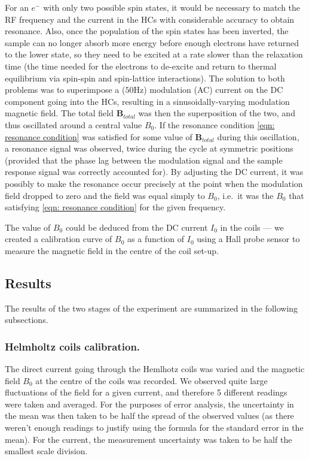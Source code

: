 \documentclass[a4paper]{jpconf}
\numberwithin{equation}{section}
\begin{document}
For an $e^-$ with only two possible spin states, it would be necessary to match the RF frequency and the current in the HCs with considerable accuracy to obtain resonance. Also, once the population of the spin states has been inverted, the sample can no longer absorb more energy before enough electrons have returned to the lower state, so they need to be excited at a rate slower than the relaxation time (the time needed for the electrons to de-excite and return to thermal equilibrium via spin-spin and spin-lattice interactions). The solution to both problems was to superimpose a ($50 \si{\hertz}$) modulation (AC) current on the DC component going into the HCs, resulting in a sinusoidally-varying modulation magnetic field. The total field $\mathbf{B}_{total}$ was then the superposition of the two, and thus oscillated around a central value $B_0$. If the resonance condition \eqref{eqn: resonance condition} was satisfied for some value of $\mathbf{B}_{total}$ during this oscillation, a resonance signal was observed, twice during the cycle at symmetric positions (provided that the phase lag between the modulation signal and the sample response signal was correctly accounted for). By adjusting the DC current, it was possibly to make the resonance occur precisely at the point when the modulation field dropped to zero and the field was equal simply to $B_0$, i.e.\ it was the $B_0$ that satisfying \eqref{eqn: resonance condition} for the given frequency.

The value of $B_0$ could be deduced from the DC current $I_0$ in the coils --- we created a calibration curve of $B_0$ as a function of $I_0$ using a Hall probe sensor to measure the magnetic field in the centre of the coil set-up.

\subsection{Results}
The results of the two stages of the experiment are summarized in the following subsections.

\subsubsection{Helmholtz coils calibration.} \label{section: calibration}
The direct current going through the Hemlhotz coils was varied and the magnetic field $B_0$ at the centre of the coils was recorded. We observed quite large fluctuations of the field for a given current, and therefore 5 different readings were taken and averaged. For the purposes of error analysis, the uncertainty in the mean was then taken to be half the spread of the observed values (as there weren't enough readings to justify using the formula for the standard error in the mean). For the current, the measurement uncertainty was taken to be half the smallest scale division. 
\end{document}
